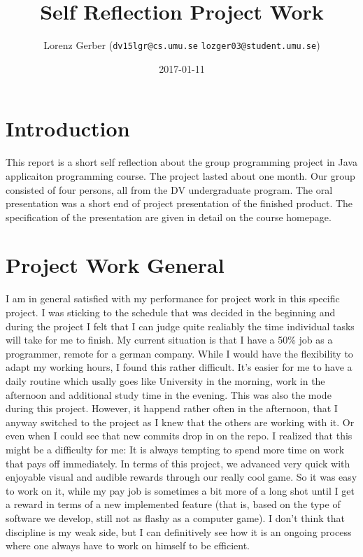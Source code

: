 \documentclass[a4paper,11pt,twoside]{article}
\title{Self Reflection Project Work}
\author{Lorenz Gerber ({\tt{dv15lgr@cs.umu.se}} {\tt{lozger03@student.umu.se}})}
\date{2017-01-11}
\begin{document}
\lstset{language=C}
\maketitle
\thispagestyle{empty}
\newpage
\tableofcontents
\thispagestyle{empty}
\newpage

\clearpage
{}

\section{Introduction}
This report is a short self reflection about the group programming project in Java applicaiton programming course. The project lasted about one month. Our group consisted of four persons, all from the DV undergraduate program. The oral presentation was a short end of project presentation of the finished product. The specification of the presentation are given in detail on the course homepage.

\section{Project Work General}
I am in general satisfied with my performance for project work in this specific project. I was sticking to the schedule that was decided in the beginning and during the project I felt that I can judge quite realiably the time individual tasks will take for me to finish.
My current situation is that I have a 50\% job as a programmer, remote for a german company. While I would have the flexibility to adapt my working hours, I found this rather difficult. It's easier for me to have a daily routine which usally goes like University in the morning, work in the afternoon and additional study time in the evening. This was also the mode during this project. However, it happend rather often in the afternoon, that I anyway switched to the project as I knew that the others are working with it. Or even when I could see that new commits drop in on the repo. I realized that this might be a difficulty for me: It is always tempting to spend more time on work that pays off immediately. In terms of this project, we advanced very quick with enjoyable visual and audible rewards through our really cool game. So it was easy to work on it, while my pay job is sometimes a bit more of a long shot until I get a reward in terms of a new implemented feature (that is, based on the type of software we develop, still not as flashy as a computer game).
I don't think that discipline is my weak side, but I can definitively see how it is an ongoing process where one always have to work on himself to be efficient. 
\end{document}
